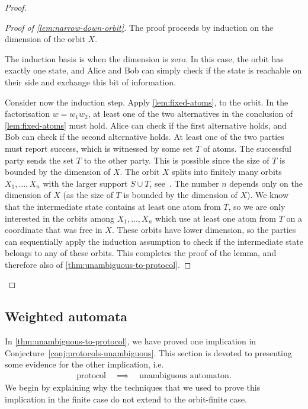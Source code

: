 \begin{proof}
\begin{proof}[Proof of \cref{lem:narrow-down-orbit}]
    The proof proceeds by induction on the dimension of the orbit $X$.
    
    The induction basis is when the  dimension is zero. In this case, the orbit has exactly one state, and Alice and Bob can simply check  if the state is reachable on their side and exchange this bit of information.

    Consider now the induction step. Apply \cref{lem:fixed-atoms}, to the orbit. In the factorisation $w = w_1 w_2$, at least one of the two alternatives in the conclusion of \cref{lem:fixed-atoms} must hold. Alice can check if the first alternative holds, and Bob can check if the second alternative holds.  At least one of the two parties must report success, which is witnessed by some set $T$ of atoms. The successful party sends the set $T$ to the other party. This is possible since the size of $T$ is bounded by the dimension of $X$. The orbit $X$ splits into finitely many orbits $X_1,\ldots,X_n$ with the larger support $S \cup T$, see~\cite[Lemma 10.9]{bojanczyk_slightly}. The number $n$ depends only on the dimension of $X$ (as the size of $T$ is bounded by the dimension of $X$).
    We know that the intermediate state contains at least one atom from $T$, so we are only interested in the orbits among $X_1,\ldots,X_n$ which use at least one atom from $T$ on a coordinate that was free in $X$. These orbits have lower dimension,
    so the parties can sequentially apply the induction assumption to check if the intermediate state belongs to any of these orbits.
    This completes the proof of the lemma, and therefore also of \cref{thm:unambiguous-to-protocol}.
\end{proof}
\end{proof}


\subsection{Weighted automata}
\label{sec:weighted-automata-atoms}

In \cref{thm:unambiguous-to-protocol}, we have proved one implication in Conjecture~\ref{conj:protocols-unambiguous}. This section is devoted to presenting some evidence for the other implication, i.e.
\begin{align}\label{eq:missing-orbit-finite-implication}
\text{protocol} \quad \implies \quad \text{unambiguous automaton}.
\end{align}
 We begin by explaining why the techniques that we used to prove this implication in the finite case do not extend to the orbit-finite case. 

